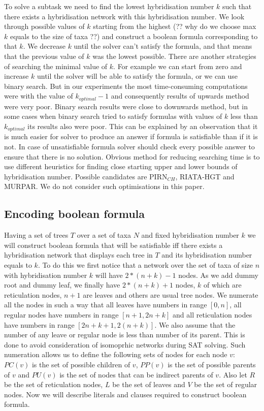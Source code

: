 \documentclass[runningheads, envcountsame, a4paper]{llncs}
\begin{document}
To solve a subtask we need to find the lowest hybridisation number $k$ such that there exists a hybridisation 
network with this hybridisation number. We look through possible values of $k$ starting from the highest (?? why do 
we choose max $k$ equals to the size of taxa ??) and construct a boolean formula corresponding to that $k$. 
We decrease $k$ until the solver can't satisfy the formula, and that means that the previous value of $k$ was the 
lowest possible. There are another strategies of searching the minimal value of $k$. For example we can start from 
zero and increase $k$ until the solver will be able to satisfy the formula, or we can use binary search. But in our 
experiments the most time-consuming computations were with the value of $k_{optimal} - 1$ and consequently results of 
upwards method were very poor. Binary search results were close to downwards method, but in some cases when binary search 
tried to satisfy formulas with values of $k$ less than $k_{optimal}$ its results also were poor. This can be explained by 
an observation that it is much easier for solver to produce an answer if formula is satisfiable than if it is not. In case 
of unsatisfiable formula solver should check every possible answer to ensure that there is no solution. Obvious method 
for reducing searching time is to use different heuristics for finding close starting upper and lower bounds of 
hybridisation number. Possible candidates are PIRN$_{CH}$, RIATA-HGT and MURPAR. We do not consider such optimisations in this paper.

\subsection{Encoding boolean formula}

Having a set of trees $T$ over a set of taxa $N$ and fixed hybridisation number $k$ we will construct boolean formula 
that will be satisfiable iff there exists a hybridisation network that displays each tree in $T$ and its hybridisation 
number equals to $k$. To do this we first notice that a network over the set of taxa of size $n$ with hybridisation number 
$k$ will have $2 * (n + k) - 1$ nodes. As we add dummy root and dummy leaf, we finally have $2 * (n + k) + 1$ nodes, 
$k$ of which are reticulation nodes, $n + 1$ are leaves and others are usual tree nodes. We numerate all the nodes in such a way 
that all leaves have numbers in range $[0,n]$, all regular nodes have numbers in range $[n + 1,2n + k]$ and all reticulation nodes have numbers 
in range $[2n + k + 1, 2(n + k)]$. We also assume that the number of any leave or regular node is less than number of its parent. This is done to 
avoid consideration of isomoprhic networks during SAT solving. Such numeration allows us to define the following sets of nodes for each node 
$v$: $PC(v)$ is the set of possible children of $v$, $PP(v)$ is the set of possible parents of $v$ and $PU(v)$ is the set of nodes that can 
be indirect parents of $v$. Also let $R$ be the set of reticulation nodes, $L$ be the set of leaves and $V$ be the set of regular nodes. 
Now we will describe literals and clauses required to construct boolean formula.
\end{document}

